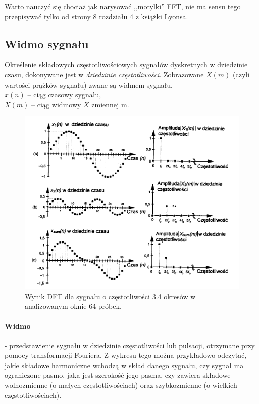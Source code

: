 \documentclass[a4paper,twoside]{report}
\begin{document}
Warto nauczyć się chociaż jak narysować ,,motylki'' FFT, nie ma sensu tego przepisywać tylko od strony 8 rozdziału 4 z książki Lyonsa.

\subsection{Widmo sygnału}
Określenie składowych częstotliwościowych sygnałów dyskretnych w dziedzinie czasu, dokonywane jest w \textit{dziedzinie częstotliwości}. Zobrazowane $X(m)$ (czyli wartości prążków sygnału) zwane są widmem sygnału.\\
$x(n)$ – ciąg czasowy sygnału,\\
$X(m)$ – ciąg widmowy $X$ zmiennej m.

\begin{figure}[htbp]
	\centering
	\includegraphics[scale=0.7]{obrazy/fourier/widmo.png}
	\caption{Wynik DFT dla sygnału o częstotliwości 3.4 okresów w analizowanym oknie 64 próbek. }
\end{figure}

\paragraph{Widmo} - przedstawienie sygnału w dziedzinie częstotliwości lub pulsacji, otrzymane przy pomocy transformacji Fouriera.
Z wykresu tego można przykładowo odczytać, jakie składowe harmoniczne wchodzą w skład danego sygnału, czy sygnał ma ograniczone pasmo, jaka jest szerokość jego pasma, czy zawiera składowe wolnozmienne (o małych częstotliwościach) oraz szybkozmienne (o wielkich częstotliwościach). 
\end{document}
